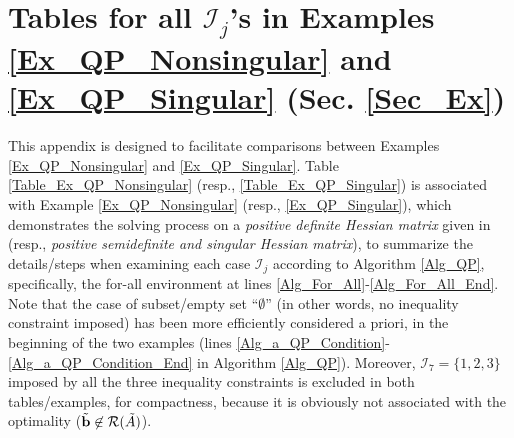 \documentclass{imaman}
\newcommand{\bfb}{{\bf b}}
\newcommand{\calI}{{\mathcal I}}
\newcommand{\calR}{{\mathcal R}}
\numberwithin{equation}{section}
\begin{document}
\section{Tables for all $\calI_j$'s in Examples \ref{Ex_QP_Nonsingular} and \ref{Ex_QP_Singular} (Sec. \ref{Sec_Ex})}
\label{App_Tables}

This appendix is designed to facilitate comparisons between Examples \ref{Ex_QP_Nonsingular} and \ref{Ex_QP_Singular}. Table \ref{Table_Ex_QP_Nonsingular} (resp., \ref{Table_Ex_QP_Singular}) is associated with Example \ref{Ex_QP_Nonsingular} (resp., \ref{Ex_QP_Singular}), which demonstrates the solving process on a \textit{positive definite Hessian matrix} given in \cite{Lu(Ye):03(16)} (resp., \textit{positive semidefinite and singular Hessian matrix}), to summarize the details/steps when examining each case $\calI_j$ according to Algorithm \ref{Alg_QP}, specifically, the for-all environment at lines \ref{Alg_For_All}-\ref{Alg_For_All_End}. Note that the case of subset/empty set ``$\emptyset$'' (in other words, no inequality constraint imposed) has been more efficiently considered a priori, in the beginning of the two examples (lines \ref{Alg_a_QP_Condition}-\ref{Alg_a_QP_Condition_End} in Algorithm \ref{Alg_QP}). Moreover, $\calI_7=\{1,2,3\}$ imposed by all the three inequality constraints is excluded in both tables/examples, for compactness, because it is obviously not associated with the optimality ($\tilde\bfb\not\in\calR(\tilde A)$).
\end{document}
